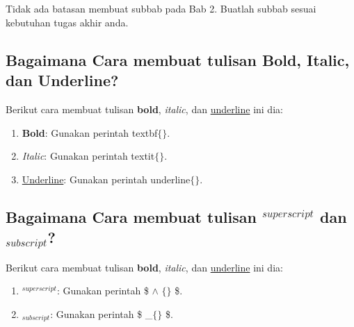 %
%
%
%

\chapter{\babDua}
Tidak ada batasan membuat subbab pada Bab 2. Buatlah subbab sesuai kebutuhan tugas akhir anda.


\section{Bagaimana Cara membuat tulisan Bold, Italic, dan Underline?}
Berikut cara membuat tulisan \textbf{bold}, \textit{italic}, dan \underline{underline} ini dia: 

\begin{enumerate}
	\item \textbf{Bold}: Gunakan perintah \bslash textbf$\lbrace\rbrace$.
	\item \textit{Italic}: Gunakan perintah \bslash textit$\lbrace\rbrace$.
	\item \underline{Underline}: Gunakan perintah \bslash underline$\lbrace\rbrace$.
\end{enumerate}

\section{Bagaimana Cara membuat tulisan $^{superscript}$ dan $_{subscript}$?}
Berikut cara membuat tulisan \textbf{bold}, \textit{italic}, dan \underline{underline} ini dia: 

\begin{enumerate}
	\item $^{superscript}$: Gunakan perintah \$ $\wedge$ $\lbrace\rbrace$ \$. 
	\item $_{subscript}$: Gunakan perintah \$ \_$\lbrace\rbrace$ \$. 
\end{enumerate}

